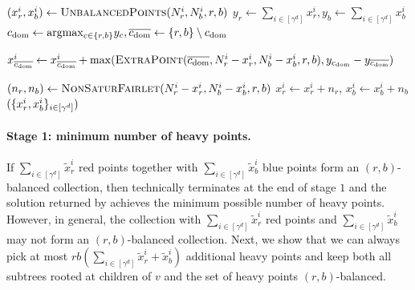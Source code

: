 \begin{algorithm}[t]
\caption{}
\begin{algorithmic}[1]
	\item[]
		\STATE $(x^i_r, x^i_b) \leftarrow \Call{\unbalancedPoints}{N^i_r, N^i_b, r, b}$ 
	\ENDFOR
	\STATE $y_r \leftarrow \sum_{i\in[\gamma^d]} x^i_r, y_b \leftarrow \sum_{i\in[\gamma^d]} x^i_b$
	\STATE $c_{\mathrm{dom}} \leftarrow \mathrm{argmax}{}_{c\in\{r,b\}} y_c, \overline{c_{\mathrm{dom}}} \leftarrow \{r,b\}\setminus c_{\mathrm{dom}}$
	
	\item[]
	\ENDIF
		\STATE $x^i_{\bar{c_{\dom}}} \leftarrow x^i_{\bar{c_\dom}} + \max(\Call{\extraPoints}{\bar{c_{\dom}}, N^i_r - x^i_r, N^i_b - x^i_b, r, b}, y_{c_{\dom}} - y_{\bar{c_{\dom}}})$	
	\ENDFOR

	\item[]
	\ENDIF

		\STATE $(n_r, n_b) \leftarrow \Call{\freeFairlet}{N^i_r - x^i_r, N^i_b - x^i_b, r, b}$ 
		\STATE $x^i_r \leftarrow x^i_r + n_r$, $x^i_b \leftarrow x^i_b + n_b$
	\ENDFOR	
	\RETURN $(\{x^i_r, x^i_b\}_{i\in[\gamma^d]})$
\end{algorithmic}
\end{algorithm}

\paragraph{Stage 1: minimum number of heavy points.}
If $\sum_{i\in[\gamma^d]} \tilde{x}^i_r$ red points together with $\sum_{i\in[\gamma^d]}\tilde{x}^i_b$ blue points form an $(r,b)$-balanced collection, then \Call{\minHeavy} technically terminates at the end of stage $1$ and the solution returned by \Call{\minHeavy} achieves the minimum possible number of heavy points. 
However, in general, the collection with $\sum_{i\in[\gamma^d]} \tilde{x}^i_r$ red points and $\sum_{i\in[\gamma^d]}\tilde{x}^i_b$ may not form an $(r,b)$-balanced collection. Next, we show that we can always pick at most $rb(\sum_{i\in[\gamma^d]} \tilde{x}^i_r + \tilde{x}^i_b)$ additional heavy points and keep both all subtrees rooted at children of $v$ and the set of heavy points $(r,b)$-balanced.  



